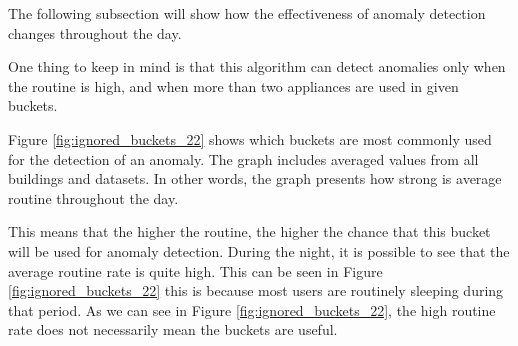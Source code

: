 The following subsection will show how the effectiveness of anomaly detection changes throughout the day.

One thing to keep in mind is that this algorithm can detect anomalies only when
the routine is high, and when more than two appliances are used in given buckets.

Figure \ref{fig:ignored_buckets_22} shows which buckets are most commonly used for the detection of an anomaly.
The graph includes averaged values from all buildings and datasets. 
In other words, the graph presents how strong is average routine throughout the day.

This means that the higher the routine, the higher the chance that this bucket will be used for anomaly detection.
During the night, it is possible to see that the average routine rate is quite high.
This can be seen in Figure \ref{fig:ignored_buckets_22}
this is because most users are routinely sleeping during that period.
As we can see in Figure \ref{fig:ignored_buckets_22},
the high routine rate does not necessarily mean the buckets are useful.


